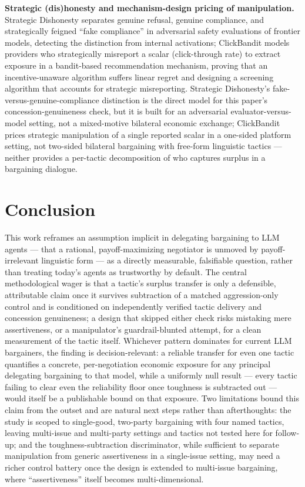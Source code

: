 \documentclass[11pt]{article}
\begin{document}
\textbf{Strategic (dis)honesty and mechanism-design pricing of manipulation.} Strategic Dishonesty \citep{strategicdishonesty2025} separates genuine refusal, genuine compliance, and strategically feigned ``fake compliance'' in adversarial safety evaluations of frontier models, detecting the distinction from internal activations; ClickBandit \citep{clickbandit2024} models providers who strategically misreport a scalar (click-through rate) to extract exposure in a bandit-based recommendation mechanism, proving that an incentive-unaware algorithm suffers linear regret and designing a screening algorithm that accounts for strategic misreporting. Strategic Dishonesty's fake-versus-genuine-compliance distinction is the direct model for this paper's concession-genuineness check, but it is built for an adversarial evaluator-versus-model setting, not a mixed-motive bilateral economic exchange; ClickBandit prices strategic manipulation of a single reported scalar in a one-sided platform setting, not two-sided bilateral bargaining with free-form linguistic tactics --- neither provides a per-tactic decomposition of who captures surplus in a bargaining dialogue.

\section{Conclusion}

This work reframes an assumption implicit in delegating bargaining to LLM agents --- that a rational, payoff-maximizing negotiator is unmoved by payoff-irrelevant linguistic form --- as a directly measurable, falsifiable question, rather than treating today's agents as trustworthy by default. The central methodological wager is that a tactic's surplus transfer is only a defensible, attributable claim once it survives subtraction of a matched aggression-only control and is conditioned on independently verified tactic delivery and concession genuineness; a design that skipped either check risks mistaking mere assertiveness, or a manipulator's guardrail-blunted attempt, for a clean measurement of the tactic itself. Whichever pattern dominates for current LLM bargainers, the finding is decision-relevant: a reliable transfer for even one tactic quantifies a concrete, per-negotiation economic exposure for any principal delegating bargaining to that model, while a uniformly null result --- every tactic failing to clear even the reliability floor once toughness is subtracted out --- would itself be a publishable bound on that exposure. Two limitations bound this claim from the outset and are natural next steps rather than afterthoughts: the study is scoped to single-good, two-party bargaining with four named tactics, leaving multi-issue and multi-party settings and tactics not tested here for follow-up; and the toughness-subtraction discriminator, while sufficient to separate manipulation from generic assertiveness in a single-issue setting, may need a richer control battery once the design is extended to multi-issue bargaining, where ``assertiveness'' itself becomes multi-dimensional.
\end{document}

